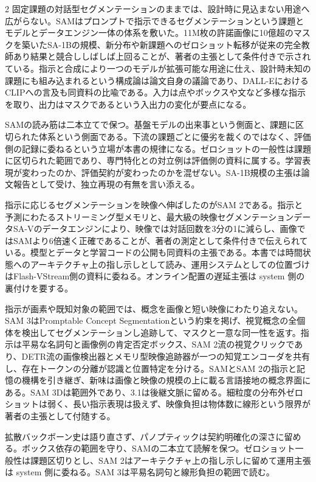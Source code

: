 \documentclass[lualatex,a4paper,10pt]{jlreq}
\begin{document}
\begin{multicols}{2}
\noindent 固定課題の対話型セグメンテーションのままでは、設計時に見込まない用途へ広がらない。SAMはプロンプトで指示できるセグメンテーションという課題とモデルとデータエンジン一体の体系を敷いた。11M枚の許諾画像に10億超のマスクを築いたSA-1Bの規模、新分布や新課題へのゼロショット転移が従来の完全教師あり結果と競合ししばしば上回ることが、著者の主張として条件付きで示されている。指示と合成により一つのモデルが拡張可能な用途に仕え、設計時未知の課題にも組み込まれるという構成論は論文自身の議論であり、DALL-EにおけるCLIPへの言及も同資料の比喩である。入力は点やボックスや文など多様な指示を取り、出力はマスクであるという入出力の変化が要点になる。\autocite{vmd017}\par\medskip
\noindent SAMの読み筋は二本立てで保つ。基盤モデルの出来事という側面と、課題に区切られた体系という側面である。下流の課題ごとに優劣を裁くのではなく、評価側の記録に委ねるという立場が本書の規律になる。ゼロショットの一般性は課題に区切られた範囲であり、専門特化との対立例は評価側の資料に属する。学習表現が変わったのか、評価契約が変わったのかを混ぜない。SA-1B規模の主張は論文報告として受け、独立再現の有無を言い添える。\autocite{vmd017}\par\medskip
\noindent 指示に応じるセグメンテーションを映像へ伸ばしたのがSAM 2である。指示と予測にわたるストリーミング型メモリと、最大級の映像セグメンテーションデータSA-Vのデータエンジンにより、映像では対話回数を3分の1に減らし、画像ではSAMより6倍速く正確であることが、著者の測定として条件付きで伝えられている。模型とデータと学習コードの公開も同資料の主張である。本書では時間状態へのアーキテクチャ上の指し示しとして読み、運用システムとしての位置づけはFlash-VStream側の資料に委ねる。オンライン配置の遅延主張は system 側の裏付けを要する。\autocite{vmd018}\par\medskip
\noindent 指示が画素や既知対象の範囲では、概念を画像と短い映像にわたり追えない。SAM 3はPromptable Concept Segmentationという約束を掲げ、視覚概念の全個体を検出してセグメンテーションし追跡して、マスクと一意な同一性を返す。指示は平易な名詞句と画像例の肯定否定ボックス、SAM 2流の視覚クリックであり、DETR流の画像検出器とメモリ型映像追跡器が一つの知覚エンコーダを共有し、存在トークンの分離が認識と位置特定を分ける。SAMとSAM 2の指示と記憶の機構を引き継ぎ、新味は画像と映像の規模の上に載る言語接地の概念界面にある。SAM 3Dは範囲外であり、3.1は後継文脈に留める。細粒度の分布外ゼロショットは弱く、長い指示表現は扱えず、映像負担は物体数に線形という限界が著者の主張として付随する。\autocite{vmd115}\par\medskip
\end{multicols}
\begin{claimboundary}[本節の読解上の境界]
\noindent 拡散バックボーン史は語り直さず、パノプティックは契約明確化の深さに留める。ボックス依存の範囲を守り、SAMの二本立て読解を保つ。ゼロショット一般性は課題区切りとし、SAM 2はアーキテクチャ上の指し示しに留めて運用主張は system 側に委ねる。SAM 3は平易名詞句と線形負担の範囲で読む。\autocite{vmd013,vmd015,vmd017,vmd018,vmd115,vmd014,vmd016}\par
\end{claimboundary}
\end{document}
